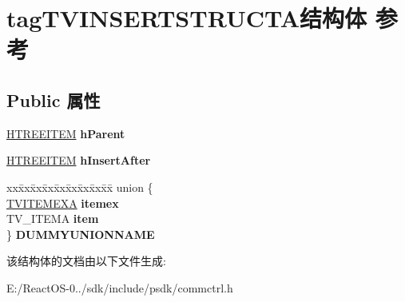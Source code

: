 \hypertarget{structtag_t_v_i_n_s_e_r_t_s_t_r_u_c_t_a}{}\section{tag\+T\+V\+I\+N\+S\+E\+R\+T\+S\+T\+R\+U\+C\+T\+A结构体 参考}
\label{structtag_t_v_i_n_s_e_r_t_s_t_r_u_c_t_a}
\subsection*{Public 属性}
\begin{DoxyCompactItemize}
\item 
\mbox{\label{structtag_t_v_i_n_s_e_r_t_s_t_r_u_c_t_a_aab355ccc38aadfcf8c83db9b253ea864}} 
\hyperlink{struct___t_r_e_e_i_t_e_m}{H\+T\+R\+E\+E\+I\+T\+EM} {\bfseries h\+Parent}
\item 
\mbox{\label{structtag_t_v_i_n_s_e_r_t_s_t_r_u_c_t_a_ad0448c72763afe6d5bd85919c58b7a0a}} 
\hyperlink{struct___t_r_e_e_i_t_e_m}{H\+T\+R\+E\+E\+I\+T\+EM} {\bfseries h\+Insert\+After}
\item 
\mbox{\label{structtag_t_v_i_n_s_e_r_t_s_t_r_u_c_t_a_af18e1fe2af8ff8900da3d10784c9e6c9}} 
\begin{tabbing}
xx\=xx\=xx\=xx\=xx\=xx\=xx\=xx\=xx\=\kill
union \{\\
\>\hyperlink{structtag_t_v_i_t_e_m_e_x_a}{TVITEMEXA} {\bfseries itemex}\\
\>TV\_ITEMA {\bfseries item}\\
\} {\bfseries DUMMYUNIONNAME}\\

\end{tabbing}\end{DoxyCompactItemize}


该结构体的文档由以下文件生成\+:\begin{DoxyCompactItemize}
\item 
E\+:/\+React\+O\+S-\/0../sdk/include/psdk/commctrl.\+h\end{DoxyCompactItemize}
